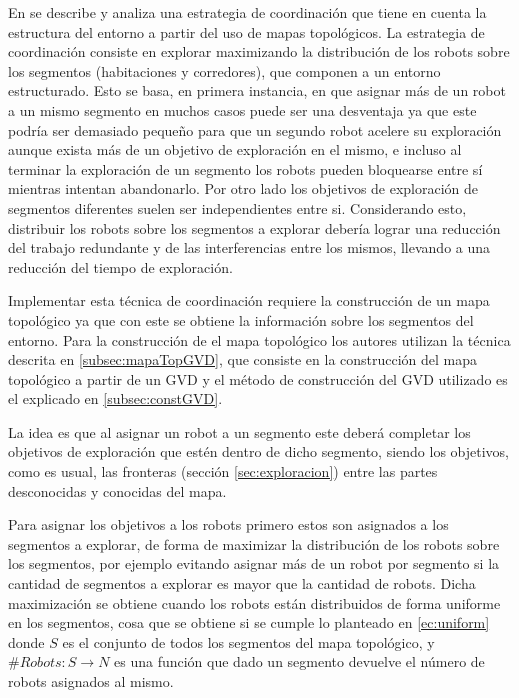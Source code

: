 En \cite{wurm2008coordinated} se describe y analiza una estrategia de
coordinación que tiene en cuenta la estructura del entorno a partir del uso de
mapas topológicos. La estrategia de coordinación consiste en explorar
maximizando la distribución de los robots sobre los segmentos (habitaciones y
corredores), que componen a un entorno estructurado. Esto se basa, en primera
instancia, en que asignar más de un robot a un mismo segmento en muchos casos
puede ser una desventaja ya que este podría ser demasiado pequeño para que un
segundo robot acelere su exploración aunque exista más de un objetivo de
exploración en el mismo, e incluso al terminar la exploración de un segmento
los robots pueden bloquearse entre sí mientras intentan abandonarlo. Por otro
lado los objetivos de exploración de segmentos diferentes suelen ser
independientes entre si. Considerando esto, distribuir los robots sobre los
segmentos a explorar debería lograr una reducción del trabajo redundante y de
las interferencias entre los mismos, llevando a una reducción del tiempo de
exploración.

Implementar esta técnica de coordinación requiere la construcción de un mapa topológico ya que con este se obtiene la información sobre los segmentos del entorno. Para la construcción de el mapa topológico los autores utilizan la técnica descrita en \ref{subsec:mapaTopGVD}, que consiste en la construcción del mapa topológico a partir de un GVD y el método de construcción del GVD utilizado es el explicado en \ref{subsec:constGVD}.

La idea es que al asignar un robot a un segmento este deberá completar los objetivos de exploración que estén dentro de dicho segmento, siendo los objetivos, como es usual, las fronteras (sección \ref{sec:exploracion}) entre las partes desconocidas y conocidas del mapa. 

Para asignar los objetivos a los robots primero estos son asignados a los segmentos a explorar, de forma de maximizar la distribución de los robots sobre los segmentos, por ejemplo evitando asignar más de un robot por segmento si la cantidad de segmentos a explorar es mayor que la cantidad de robots. Dicha maximización se obtiene cuando los robots están distribuidos de forma uniforme en los segmentos, cosa que se obtiene si se cumple lo planteado en \eqref{ec:uniform} donde $S$ es el conjunto de todos los segmentos del mapa topológico, y $\#Robots : S \rightarrow N$ es una función que dado un segmento devuelve el número de robots asignados al mismo. 

